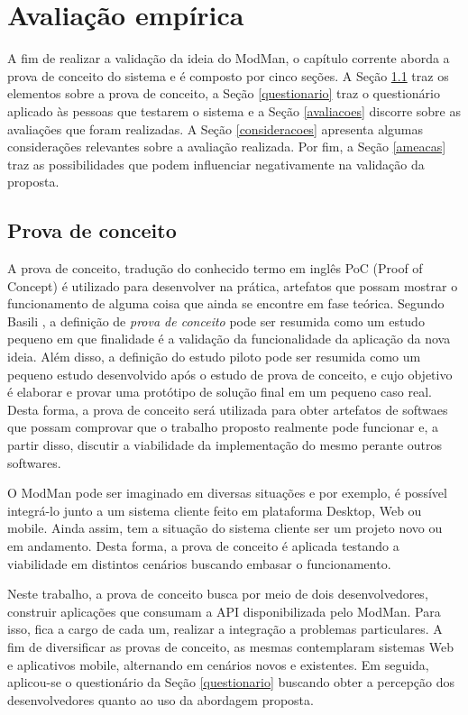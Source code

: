\chapter{Avaliação empírica}


A fim de realizar a validação da ideia do ModMan, o capítulo corrente aborda a prova de conceito do sistema e é composto por cinco seções. A Seção \ref{prova} traz os elementos sobre a prova de conceito, a Seção \ref{questionario} traz o questionário aplicado às pessoas que testarem o sistema e a Seção \ref{avaliacoes} discorre sobre as avaliações que foram realizadas. A Seção \ref{consideracoes} apresenta algumas considerações relevantes sobre a avaliação realizada. Por fim, a Seção \ref{ameacas} traz as possibilidades que podem influenciar negativamente na validação da proposta.


\section{Prova de conceito}\label{prova}


A prova de conceito, tradução do conhecido termo em inglês PoC (Proof of Concept) é utilizado para desenvolver na prática, artefatos que possam mostrar o funcionamento de alguma coisa que ainda se encontre em fase teórica. Segundo Basili \citep{Basili1991}, a definição de \textit{prova de conceito} pode ser resumida como um estudo pequeno em que finalidade é a validação da funcionalidade da aplicação da nova ideia. Além disso, a definição do estudo piloto pode ser resumida como um pequeno estudo desenvolvido após o estudo de prova de conceito, e cujo objetivo é elaborar e provar uma protótipo de solução final em um pequeno caso real.
Desta forma, a prova de conceito será utilizada para obter artefatos de softwaes que possam comprovar que o trabalho proposto realmente pode funcionar e, a partir disso, discutir a viabilidade da implementação do mesmo perante outros softwares.

O ModMan pode ser imaginado em diversas situações e por exemplo, é possível integrá-lo junto a um sistema cliente feito em plataforma Desktop, Web ou mobile. Ainda assim, tem a situação do sistema cliente ser um projeto novo ou em andamento. Desta forma, a prova de conceito é aplicada testando a viabilidade em distintos cenários buscando embasar o funcionamento.

Neste trabalho, a prova de conceito busca por meio de dois desenvolvedores, construir aplicações que consumam a API disponibilizada pelo ModMan. Para isso, fica a cargo de cada um, realizar a integração a problemas particulares. A fim de diversificar as provas de conceito, as mesmas contemplaram sistemas Web e aplicativos mobile, alternando em cenários novos e existentes. Em seguida, aplicou-se o questionário da Seção \ref{questionario} buscando obter a percepção dos desenvolvedores quanto ao uso da abordagem proposta.


